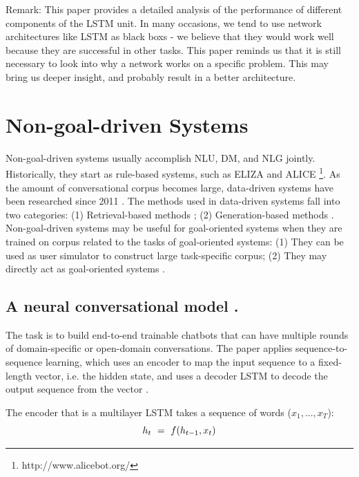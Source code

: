 \documentclass[paper=a4, fontsize=18pt]{article} %
\numberwithin{equation}{section} %
\numberwithin{figure}{section} %
\numberwithin{table}{section} %
\begin{document}
Remark: This paper provides a detailed analysis of the performance of different components of the LSTM unit. In many occasions, we tend to use network architectures like LSTM as black boxs - we believe that they would work well because they are successful in other tasks. This paper reminds us that it is still necessary to look into why a network works on a specific problem. This may bring us deeper insight, and probably result in a better architecture.

\section{Non-goal-driven Systems} \label{Non-goal-driven Systems}

Non-goal-driven systems usually accomplish NLU, DM, and NLG jointly. Historically, they start as rule-based systems, such as ELIZA \cite{Weizenbaum1966Eliza} and ALICE \footnote{http://www.alicebot.org/}. As the amount of conversational corpus becomes large, data-driven systems have been researched since 2011 \cite{Ritter2011Data}. The methods used in data-driven systems fall into two categories: (1) Retrieval-based methods \cite{Ji2014An, Yan2016DocChat}; (2) Generation-based methods \cite{Ritter2011Data, Shang2015Neural, Sordoni2015Hierarchical, Serban2016Building}. Non-goal-driven systems may be useful for goal-oriented systems when they are trained on corpus related to the tasks of goal-oriented systems: (1) They can be used as user simulator to construct large task-specific corpus; (2) They may directly act as goal-oriented systems \cite{Vinyals2015A}.

\subsection{A neural conversational model \cite{Vinyals2015A}.}

The task is to build end-to-end trainable chatbots that can have multiple rounds of domain-specific or open-domain conversations. The paper applies sequence-to-sequence learning, which uses an encoder to map the input sequence to a fixed-length vector, i.e. the hidden state, and uses a decoder LSTM to decode the output sequence from the vector \cite{Sutskever2014Sequence}.

The encoder that is a multilayer LSTM takes a sequence of words ($x_{1},...,x_{T}$):
\begin{equation}
h_{t} \ = \ f( h_{t-1}, x_{t} ) \\
\end{equation}
\end{document}
